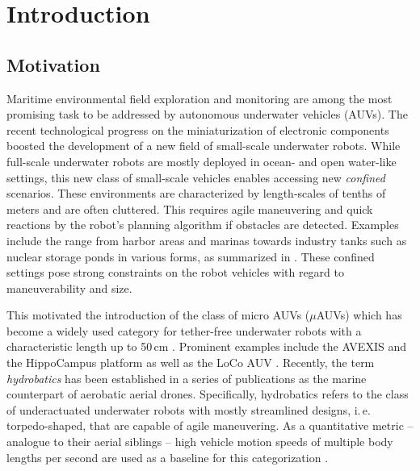 \chapter{Introduction}\label{chap:introduction}

\section{Motivation}
Maritime environmental field exploration and monitoring are among the most promising task to be addressed by autonomous underwater vehicles (AUVs).
The recent technological progress on the miniaturization of electronic components boosted the development of a new field of small-scale underwater robots.
While full-scale underwater robots are mostly deployed in ocean- and open water-like settings, this new class of small-scale vehicles enables accessing new \textit{confined} scenarios.
These environments are characterized by length-scales of tenths of meters and are often cluttered. 
This requires agile maneuvering and quick reactions by the robot’s planning algorithm if obstacles are detected.
Examples include the range from harbor areas and marinas towards industry tanks such as nuclear storage ponds in various forms, as summarized in \cite{Watson2020}.
These confined settings pose strong constraints on the robot vehicles with regard to maneuverability and size.

This motivated the introduction of the class of micro AUVs ($\mu$AUVs) which has become a widely used category for tether-free underwater robots with a characteristic length up to 50\,cm \cite{micro-auv}.
Prominent examples include the AVEXIS \cite{Griffiths2016} and the HippoCampus platform \cite{duecker2020hippocampusx} as well as the LoCo AUV \cite{Edge2020}.
Recently, the term \textit{hydrobatics} has been established in a series of publications \cite{DueckerEtAl18, Duecker20, duecker2021aerobatics} as the marine counterpart of aerobatic aerial drones.
Specifically, hydrobatics refers to the class of underactuated underwater robots with mostly streamlined designs, i.\,e. torpedo-shaped, that are capable of agile maneuvering.
As a quantitative metric  -- analogue to their aerial siblings -- high vehicle motion speeds of multiple body lengths per second are used as a baseline for this categorization \cite{duecker2021aerobatics}.

